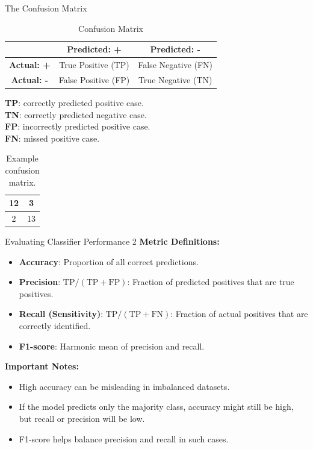 \documentclass{beamer}
\begin{document}
\begin{frame}{The Confusion Matrix}
  \begin{table}[h]
    \centering
    \begin{tabular}{|c|c|c|}
      \hline
      & \textbf{Predicted: +} & \textbf{Predicted: -} \\
      \hline
      \textbf{Actual: +} & True Positive (TP) & False Negative (FN) \\
      \hline
      \textbf{Actual: -} & False Positive (FP) & True Negative (TN) \\
      \hline
    \end{tabular}
    \caption{Confusion Matrix}
  \end{table}
  \vspace{0.5em}
  \textbf{TP}: correctly predicted positive case. \\
  \textbf{TN}: correctly predicted negative case. \\
  \textbf{FP}: incorrectly predicted positive case. \\
  \textbf{FN}: missed positive case.
  \begin{table}[|c|c|]
      \centering
      \begin{tabular}{|c|c|}
        \hline
          12 & 3 \\ \hline
          2 &  13 \\ \hline
      \end{tabular}
      \caption{Example confusion matrix.}
      \label{tab:ex-conf-mat}
  \end{table}
\end{frame}

\begin{frame}{Evaluating Classifier Performance 2}
  \textbf{Metric Definitions:}
  \begin{itemize}
    \item \textbf{Accuracy}: Proportion of all correct predictions.
    \item \textbf{Precision}: \( \text{TP} / (\text{TP} + \text{FP}) \): Fraction of predicted positives that are true positives.
    \item \textbf{Recall (Sensitivity)}: \( \text{TP} / (\text{TP} + \text{FN}) \): Fraction of actual positives that are correctly identified.
    \item \textbf{F1-score}: Harmonic mean of precision and recall.
  \end{itemize}
  \vspace{1em}
  \textbf{Important Notes:}
  \begin{itemize}
    \item High accuracy can be misleading in imbalanced datasets.
    \item If the model predicts only the majority class, accuracy might still be high, but recall or precision will be low.
    \item F1-score helps balance precision and recall in such cases.
  \end{itemize}
\end{frame}
\end{document}
